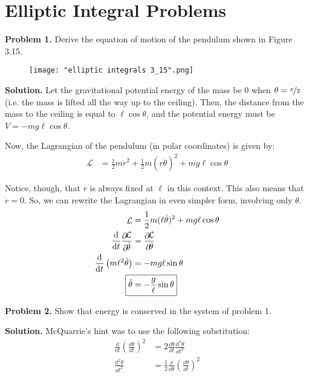 \documentclass{article}
\newcommand{\dsq}{\mathrm{d}^2\!}
\newcommand{\pd}{\mathop{\partial}\!\!} %
\newcommand{\Lagr}{\mathop{\mathcal{L}}}
\begin{document}
\insertTitle

\section*{Elliptic Integral Problems}
\textbf{Problem 1.} Derive the equation of motion of the pendulum shown in Figure 3.15.
\begin{figure}[H]
\centering
\texttt{[image: "elliptic integrals 3\_15".png]}
\end{figure}
\textbf{Solution.} Let the gravitational potential energy of the mass be 0 when $\theta = \nicefrac{\pi}{2}$ (i.e. the mass is lifted all the way up to the ceiling). Then, the distance from the mass to the ceiling is equal to $\ell\cos\theta$, and the potential energy must be $V = -mg\ell\cos\theta$.

Now, the Lagrangian of the pendulum (in polar coordinates) is given by:
\begin{equation}
\begin{aligned}
\Lagr &= \frac{1}{2}m\dot{r}^2+ \frac{1}{2}m(r\dot{\theta})^2 + mg\ell\cos\theta
\end{aligned}
\end{equation}

Notice, though, that $r$ is always fixed at $\ell$ in this context. This also means that $\dot{r} = 0$. So, we can rewrite the Lagrangian in even simpler form, involving only $\theta$.
\begin{equation*}
\begin{aligned}
\Lagr &= \frac{1}{2}m(\ell\dot{\theta})^2 + mg\ell\cos\theta \\
\frac{\dd}{\dd t}\frac{\pd\mathcal{L}}{\pd\dot{\theta}} &= \frac{\pd\mathcal{L}}{\pd\theta} \\
\frac{\dd}{\dd t}\left(m\ell ^2\dot{\theta}\right) &= -mg\ell\sin\theta \\
\Aboxed{\ddot{\theta} &= -\frac{g}{\ell}\sin\theta}
\end{aligned}
\end{equation*}

\textbf{Problem 2.} Show that energy is conserved in the system of problem 1.

\textbf{Solution.} McQuarrie's hint was to use the following substitution:
\begin{equation*}
\begin{aligned}
\frac{\dd}{\dd t}\left(\frac{\dd\theta}{\dd t}\right)^2 &= 2\frac{\dd\theta}{\dd t}\frac{\dsq\theta}{\dd t^2} \\
\frac{\dsq\theta}{\dd t^2} &= \frac{1}{2}\frac{\dd}{\dd\theta}\left(\frac{\dd\theta}{\dd t}\right)^2
\end{aligned}
\end{equation*}
\end{document}

